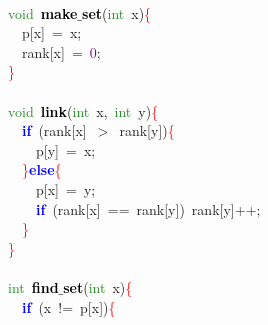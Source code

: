 {{\mbox{} \\
\mbox{}\textcolor{ForestGreen}{void}\ \textbf{\textcolor{Black}{make$\_$set}}\textcolor{BrickRed}{(}\textcolor{ForestGreen}{int}\ x\textcolor{BrickRed}{)}\textcolor{Red}{\{} \\
\mbox{}\ \ p\textcolor{BrickRed}{[}x\textcolor{BrickRed}{]}\ \textcolor{BrickRed}{=}\ x\textcolor{BrickRed}{;} \\
\mbox{}\ \ rank\textcolor{BrickRed}{[}x\textcolor{BrickRed}{]}\ \textcolor{BrickRed}{=}\ \textcolor{Purple}{0}\textcolor{BrickRed}{;} \\
\mbox{}\textcolor{Red}{\}} \\
\mbox{} \\
\mbox{}\textcolor{ForestGreen}{void}\ \textbf{\textcolor{Black}{link}}\textcolor{BrickRed}{(}\textcolor{ForestGreen}{int}\ x\textcolor{BrickRed}{,}\ \textcolor{ForestGreen}{int}\ y\textcolor{BrickRed}{)}\textcolor{Red}{\{} \\
\mbox{}\ \ \textbf{\textcolor{Blue}{if}}\ \textcolor{BrickRed}{(}rank\textcolor{BrickRed}{[}x\textcolor{BrickRed}{]}\ \textcolor{BrickRed}{$>$}\ rank\textcolor{BrickRed}{[}y\textcolor{BrickRed}{])}\textcolor{Red}{\{} \\
\mbox{}\ \ \ \ p\textcolor{BrickRed}{[}y\textcolor{BrickRed}{]}\ \textcolor{BrickRed}{=}\ x\textcolor{BrickRed}{;} \\
\mbox{}\ \ \textcolor{Red}{\}}\textbf{\textcolor{Blue}{else}}\textcolor{Red}{\{} \\
\mbox{}\ \ \ \ p\textcolor{BrickRed}{[}x\textcolor{BrickRed}{]}\ \textcolor{BrickRed}{=}\ y\textcolor{BrickRed}{;} \\
\mbox{}\ \ \ \ \textbf{\textcolor{Blue}{if}}\ \textcolor{BrickRed}{(}rank\textcolor{BrickRed}{[}x\textcolor{BrickRed}{]}\ \textcolor{BrickRed}{==}\ rank\textcolor{BrickRed}{[}y\textcolor{BrickRed}{])}\ rank\textcolor{BrickRed}{[}y\textcolor{BrickRed}{]++;} \\
\mbox{}\ \ \textcolor{Red}{\}} \\
\mbox{}\textcolor{Red}{\}} \\
\mbox{} \\
\mbox{}\textcolor{ForestGreen}{int}\ \textbf{\textcolor{Black}{find$\_$set}}\textcolor{BrickRed}{(}\textcolor{ForestGreen}{int}\ x\textcolor{BrickRed}{)}\textcolor{Red}{\{} \\
\mbox{}\ \ \textbf{\textcolor{Blue}{if}}\ \textcolor{BrickRed}{(}x\ \textcolor{BrickRed}{!=}\ p\textcolor{BrickRed}{[}x\textcolor{BrickRed}{])}\textcolor{Red}{\{} \\
}}
